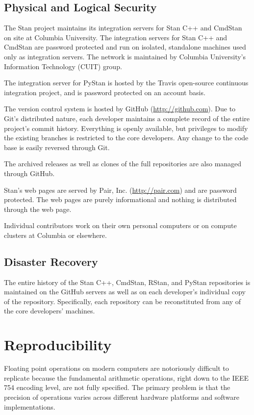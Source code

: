 \section{Physical and Logical Security}

The Stan project maintains its integration servers for Stan C++ and
CmdStan on site at Columbia University. The integration servers for
Stan C++ and CmdStan are password protected and run on isolated,
standalone machines used only as integration servers. The network is
maintained by Columbia University's Information Technology (CUIT)
group.

The integration server for PyStan is hosted by the Travis open-source
continuous integration project, and is password protected on an
account basis.

The version control system is hosted by GitHub
(\url{http://github.com}). Due to Git's distributed nature, each
developer maintains a complete record of the entire project's commit
history. Everything is openly available, but privileges to modify the
existing branches is restricted to the core developers. Any change to
the code base is easily reversed through Git.

The archived releases as well as clones of the full repositories are
also managed through GitHub.

Stan's web pages are served by Pair, Inc. (\url{http://pair.com}) and
are password protected.  The web pages are purely informational and
nothing is distributed through the web page.

Individual contributors work on their own personal computers or on
compute clusters at Columbia or elsewhere.


\section{Disaster Recovery}

The entire history of the Stan C++, CmdStan, RStan, and PyStan
repositories is maintained on the GitHub servers as well as on each
developer's individual copy of the repository. Specifically, each
repository can be reconstituted from any of the core 
developers' machines.


\chapter{Reproducibility}\label{reproducibility.chapter}

\noindent
Floating point operations on modern computers are notoriously
difficult to replicate because the fundamental arithmetic operations,
right down to the IEEE 754 encoding level, are not fully specified.
The primary problem is that the precision of operations varies across
different hardware platforms and software implementations.

